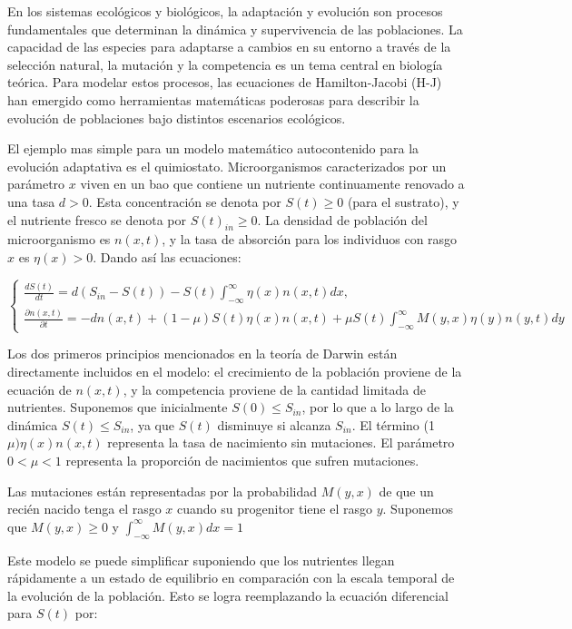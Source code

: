 En los sistemas ecológicos y biológicos, la adaptación y evolución son procesos fundamentales que determinan la dinámica y supervivencia de las poblaciones. La capacidad de las especies para adaptarse a cambios en su entorno a través de la selección natural, la mutación y la competencia es un tema central en biología teórica. Para modelar estos procesos, las ecuaciones de Hamilton-Jacobi (H-J) han emergido como herramientas matemáticas poderosas para describir la evolución de poblaciones bajo distintos escenarios ecológicos.

\citep{Mirrahimi2011}El ejemplo mas simple para un modelo matemático autocontenido para la evolución adaptativa es el quimiostato. Microorganismos caracterizados por un parámetro $x$ viven en un bao que contiene un nutriente continuamente renovado a una tasa $d>0$. Esta concentración se denota por $S(t)\geq0$ (para el sustrato), y el nutriente fresco se denota por $S(t)_{in}\geq0$. La densidad de población del microorganismo es $n(x,t)$, y la tasa de absorción para los individuos con rasgo $x$ es $\eta(x)>0$. Dando así las ecuaciones:

\begin{equation*}
	\left\{\begin{array}{l}
		\frac{d S(t)}{d t}=d\left(S_{i n}-S(t)\right)-S(t) \int_{-\infty}^{\infty} \eta(x) n(x, t) d x, \\
		\frac{\partial n(x, t)}{\partial t}=-d n(x, t)+(1-\mu) S(t) \eta(x) n(x, t)+\mu S(t) \int_{-\infty}^{\infty} M(y, x) \eta(y) n(y, t) d y
	\end{array}\right.
\end{equation*}

Los dos primeros principios mencionados en la teoría de Darwin están directamente incluidos en el modelo: el crecimiento de la población proviene de la ecuación de $n(x, t)$, y la competencia proviene de la cantidad limitada de nutrientes. Suponemos que inicialmente $S(0) \leq S_{i n}$, por lo que a lo largo de la dinámica $S(t) \leq S_{i n}$, ya que $S(t)$ disminuye si alcanza $S_{i n}$. El término (1$\mu) \eta(x) n(x, t)$ representa la tasa de nacimiento sin mutaciones. El parámetro $0<\mu<1$ representa la proporción de nacimientos que sufren mutaciones.

Las mutaciones están representadas por la probabilidad $M(y, x)$ de que un recién nacido tenga el rasgo $x$ cuando su progenitor tiene el rasgo $y$. Suponemos que $M(y, x) \geq 0$ y $\int_{-\infty}^{\infty} M(y, x) d x=1$

Este modelo se puede simplificar suponiendo que los nutrientes llegan rápidamente a un estado de equilibrio en comparación con la escala temporal de la evolución de la población. Esto se logra reemplazando la ecuación diferencial para $S(t)$ por:

